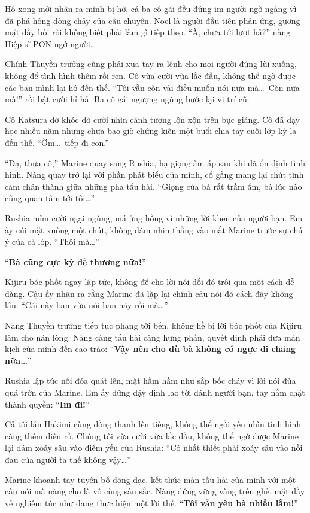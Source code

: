 \documentclass[../main.tex]{subfiles}
\begin{document}
Hô xong mới nhận ra mình bị hớ, cả ba cô gái đều đứng im người ngỡ ngàng vì đã phá hỏng dòng chảy của câu chuyện. Noel là người đầu tiên phản ứng, gương mặt đầy bối rối không biết phải làm gì tiếp theo. ``À, chưa tới lượt hả?'' nàng Hiệp sĩ PON ngớ người.

Chính Thuyền trưởng cũng phải xua tay ra lệnh cho mọi người đứng lùi xuống, không để tình hình thêm rối ren. Cô vừa cười vừa lắc đầu, không thể ngờ được các bạn mình lại hớ đến thế. ``Tôi vẫn còn vài điều muốn nói nữa mà\dots\ Còn nữa mà!'' rồi bật cười hỉ hả. Ba cô gái ngượng ngùng bước lại vị trí cũ.

Cô Katsura dở khóc dở cười nhìn cảnh tượng lộn xộn trên bục giảng. Cô đã dạy học nhiều năm nhưng chưa bao giờ chứng kiến một buổi chia tay cuối lớp kỳ lạ đến thế. ``Ờm\dots\ tiếp đi con.''

``Dạ, thưa cô,'' Marine quay sang Rushia, hạ giọng ấm áp sau khi đã ổn định tình hình. Nàng quay trở lại với phần phát biểu của mình, cố gắng mang lại chút tình cảm chân thành giữa những pha tấu hài. ``Giọng của bà rất trầm ấm, bà lúc nào cũng quan tâm tới tôi\dots''

Rushia mỉm cười ngại ngùng, má ửng hồng vì những lời khen của người bạn. Em ấy cúi mặt xuống một chút, không dám nhìn thẳng vào mắt Marine trước sự chú ý của cả lớp. ``Thôi mà\dots''

``\textbf{Bà cũng cực kỳ dễ thương nữa!}''

Kijiru bóc phốt ngay lập tức, không để cho lời nói dối đó trôi qua một cách dễ dàng. Cậu ấy nhận ra rằng Marine đã lặp lại chính câu nói đó cách đây không lâu: ``Cái này bạn vừa nói ban nãy rồi mà\dots''

Nàng Thuyền trưởng tiếp tục phang tới bến, không hề bị lời bóc phốt của Kijiru làm cho nản lòng. Nàng càng tấu hài càng hưng phấn, quyết định phải đưa màn kịch của mình đến cao trào: ``\textbf{Vậy nên cho dù bà không có ngực đi chăng nữa\dots}''

Rushia lập tức nổi đóa quát lên, mặt hầm hầm như sắp bốc cháy vì lời nói đùa quá trớn của Marine. Em ấy đứng dậy định lao tới đánh người bạn, tay nắm chặt thành quyền: ``\textbf{Im đi!}''

Cả tôi lẫn Hakimi cùng đồng thanh lên tiếng, không thể ngồi yên nhìn tình hình càng thêm điên rồ. Chúng tôi vừa cười vừa lắc đầu, không thể ngờ được Marine lại dám xoáy sâu vào điểm yếu của Rushia: ``Có nhất thiết phải xoáy sâu vào nỗi đau của người ta thế không vậy\dots''

Marine khoanh tay tuyên bố dõng dạc, kết thúc màn tấu hài của mình với một câu nói mà nàng cho là vô cùng sâu sắc. Nàng đứng vững vàng trên ghế, mặt đầy vẻ nghiêm túc như đang thực hiện một lời thề. ``\textbf{Tôi vẫn yêu bà nhiều lắm!}''
\end{document}

